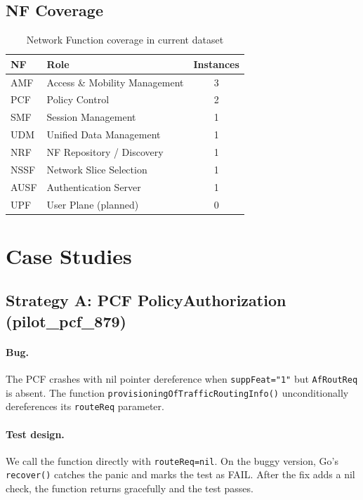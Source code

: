 \documentclass{article}
\begin{document}
\subsection{NF Coverage}

\begin{table}[h]
\centering
\caption{Network Function coverage in current dataset}
\label{tab:nf_coverage}
\begin{tabular}{llc}
\toprule
\textbf{NF} & \textbf{Role} & \textbf{Instances} \\
\midrule
AMF  & Access \& Mobility Management & 3 \\
PCF  & Policy Control                & 2 \\
SMF  & Session Management            & 1 \\
UDM  & Unified Data Management       & 1 \\
NRF  & NF Repository / Discovery     & 1 \\
NSSF & Network Slice Selection       & 1 \\
AUSF & Authentication Server         & 1 \\
\midrule
UPF  & User Plane (planned)          & 0 \\
\bottomrule
\end{tabular}
\end{table}

\section{Case Studies}

\subsection{Strategy A: PCF PolicyAuthorization (pilot\_pcf\_879)}

\paragraph{Bug.} The PCF crashes with nil pointer dereference when \texttt{suppFeat="1"} but \texttt{AfRoutReq} is absent. The function \texttt{provisioningOfTrafficRoutingInfo()} unconditionally dereferences its \texttt{routeReq} parameter.

\paragraph{Test design.} We call the function directly with \texttt{routeReq=nil}. On the buggy version, Go's \texttt{recover()} catches the panic and marks the test as FAIL. After the fix adds a nil check, the function returns gracefully and the test passes.
\end{document}
